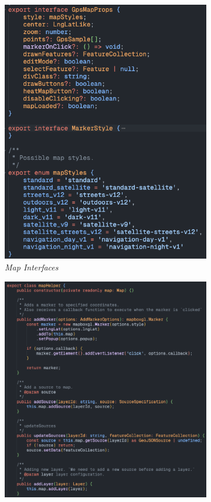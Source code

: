 \begin{figure}[!h]
	\centering
	\begin{subfigure}[c]{0.30\textwidth}
		\centering
		\includegraphics[width=\textwidth]{figs/interfaces.png}
		\caption{\textit{Map Interfaces}}
		\label{fig:mapIntefaces}
	\end{subfigure}
	\hfill
	\begin{subfigure}[c]{0.40\textwidth}
		\centering
		\includegraphics[width=\textwidth]{figs/mapClasses.png}

\end{subfigure}
\end{figure}
